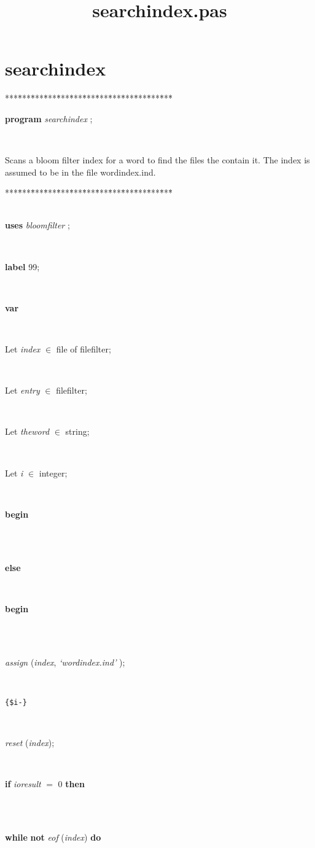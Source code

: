 \documentclass[10pt, a4paper]{article}
\title{searchindex.pas}
\begin{document}
\maketitle

\tableofcontents
\section{searchindex}
\begin{tabbing}
***\=***\=***\=***\=***\=***\=***\=***\=***\=***\=***\=***\=***\=\kill
\parbox{14cm}{\textsf{\textbf{program}  \textit{searchindex} ;}}\\
\end{tabbing}
Scans a bloom filter index for a word
to find the files the contain it.
The index is assumed to be in the file wordindex.ind.
\begin{tabbing}
***\=***\=***\=***\=***\=***\=***\=***\=***\=***\=***\=***\=***\=\kill
\\
\\
\+\parbox{14cm}{\textsf{\textbf{uses}  \textit{bloomfilter} ;}}\\
\parbox{14cm}{\textsf{\textbf{label}  99;}}\\
\<\parbox{14cm}{\textsf{\textbf{var} }}\\
\parbox{14cm}{\textsf{Let \textit{index} $\in$ file of filefilter;}}\\
\parbox{14cm}{\textsf{Let \textit{entry} $\in$ filefilter;}}\\
\parbox{14cm}{\textsf{Let \textit{theword} $\in$ string;}}\\
\parbox{14cm}{\textsf{Let \textit{i} $\in$ integer;}}\\
\-\<\+\parbox{14cm}{\textsf{\textbf{begin} }}\\
\\
\+\parbox{14cm}{\textsf{\textbf{else} }}\\
\<\parbox{14cm}{\textsf{\textbf{begin} }}\\
\\
\parbox{14cm}{\textsf{\textit{assign} (\textit{index}, \textit{\textrm{\textup { `wordindex.ind' } }})}; }\\
\parbox{14cm}{\texttt{\small{\{\$i-\}}}}\\
\parbox{14cm}{\textsf{\textit{reset} (\textit{index})}; }\\
\+\parbox{14cm}{\textsf {\textbf {if } \textsf{\textit{ioresult} $=$ 0} \textbf{ then } }}\\
\\
\+\parbox{14cm}{\textsf {\textbf {while } \textsf{\textbf{not} \textit{eof} (\textit{index}) } \textbf{ do } }}\\

\end{tabbing}
\end{document}
